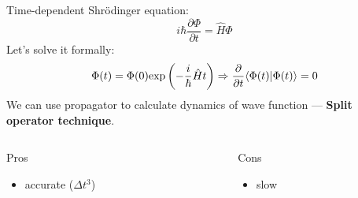 \begin{frame}{ }

\begin{block}{Time-dependent Shr\"odinger equation:}
$$i\hbar\frac{\partial\Phi}{\partial t}=\hat{H}\Phi$$
Let's solve it formally:
$$\Phi(t) = \Phi(0)\text{exp}\left(-\frac{i}{\hbar}\hat{H}t\right)\Rightarrow\frac{\partial}{\partial t}\langle \Phi(t) | \Phi(t) \rangle=0$$
We can use propagator to calculate dynamics of wave function --- \textbf{Split operator technique}.
\end{block}
\begin{columns}
\begin{column}{0.45\textwidth}
\begin{block}{Pros}
\begin{itemize}
\item accurate ($\Delta t^3$)
\end{itemize}
\end{block}
\end{column}

\begin{column}{0.45\textwidth}
\begin{block}{Cons}
\begin{itemize}
\item slow
\end{itemize}
\end{block}
\end{column}
\end{columns}


\end{frame}

